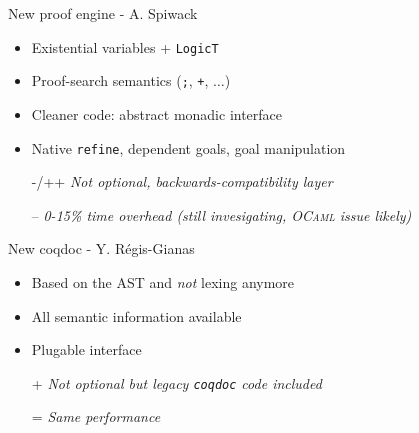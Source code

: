 \begin{subsecframe}{New proof engine - A. Spiwack}

  \begin{itemize}
  \item Existential variables + \texttt{LogicT}
  \item Proof-search semantics (\texttt{;}, \texttt{+}, $\ldots$)
  \item Cleaner code: abstract monadic interface
  \item Native \texttt{refine}, dependent goals, goal manipulation
  \end{itemize}
  
  \begin{itemize}
  \item[-/++] \emph{Not optional, backwards-compatibility layer}
  \item[--] \emph{0-15\% time overhead (still invesigating, \textsc{OCaml} issue likely)}
  \end{itemize}

\end{subsecframe}
\begin{subsecframe}{New coqdoc - Y. Régis-Gianas}
  \begin{itemize}
  \item Based on the AST and \alert{\emph{not}} lexing anymore
  \item All semantic information available
  \item Plugable interface
  \end{itemize}

  \begin{itemize}
  \item[+] \emph{Not optional but legacy \texttt{coqdoc} code included}
  \item[=] \emph{Same performance}
  \end{itemize}
  
\end{subsecframe}


